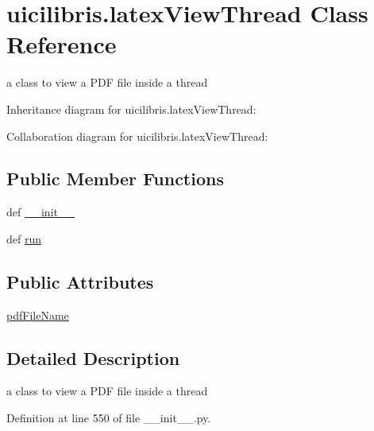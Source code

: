 \hypertarget{classuicilibris_1_1latexViewThread}{\section{uicilibris.\-latex\-View\-Thread \-Class \-Reference}
\label{classuicilibris_1_1latexViewThread}
}


a class to view a \-P\-D\-F file inside a thread  




\-Inheritance diagram for uicilibris.\-latex\-View\-Thread\-:


\-Collaboration diagram for uicilibris.\-latex\-View\-Thread\-:
\subsection*{\-Public \-Member \-Functions}
\begin{DoxyCompactItemize}
\item 
def \hyperlink{classuicilibris_1_1latexViewThread_af503531fb89e56a5727c2241c91763e7}{\-\_\-\-\_\-init\-\_\-\-\_\-}
\item 
def \hyperlink{classuicilibris_1_1latexViewThread_a1ce993aec287c3df73fd061a2b64732b}{run}
\end{DoxyCompactItemize}
\subsection*{\-Public \-Attributes}
\begin{DoxyCompactItemize}
\item 
\hyperlink{classuicilibris_1_1latexViewThread_a2280202512f395afb09e42f820d27fad}{pdf\-File\-Name}
\end{DoxyCompactItemize}


\subsection{\-Detailed \-Description}
a class to view a \-P\-D\-F file inside a thread 

\-Definition at line 550 of file \-\_\-\-\_\-init\-\_\-\-\_\-.\-py.



